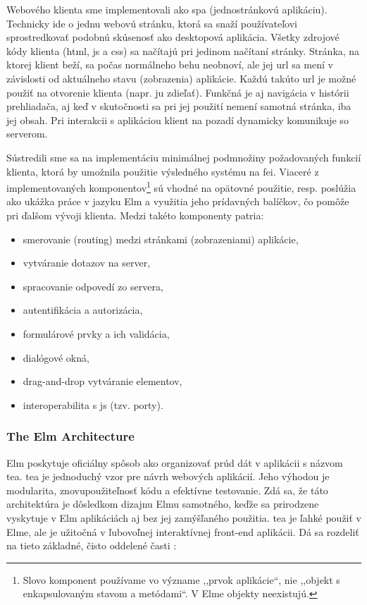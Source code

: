 Webového klienta sme implementovali ako \acrshort{spa} (jednostránkovú
aplikáciu). Technicky ide o jednu webovú stránku, ktorá sa snaží používateľovi
sprostredkovať podobnú skúsenosť ako desktopová aplikácia. Všetky zdrojové kódy
klienta (\acrshort{html}, \acrshort{js} a \acrshort{css}) sa načítajú pri
jedinom načítaní stránky. Stránka, na ktorej klient beží, sa počas normálneho
behu neobnoví, ale jej \acrshort{url} sa mení v závislosti od aktuálneho stavu
(zobrazenia) aplikácie. Každú takúto \acrshort{url} je možné použiť na otvorenie
klienta (napr. ju zdieľať). Funkčná je aj navigácia v histórii prehliadača, aj
keď v skutočnosti sa pri jej použití nemení samotná stránka, iba jej obsah. Pri
interakcii s aplikáciou klient na pozadí dynamicky komunikuje so serverom.

Sústredili sme sa na implementáciu minimálnej podmnožiny požadovaných funkcií
klienta, ktorá by umožnila použitie výsledného systému na \acrshort{fei}.
Viaceré z implementovaných komponentov\footnote{Slovo komponent používame vo
  význame ,,prvok aplikácie``, nie ,,objekt s enkapsulovaným stavom a
  metódami``. V Elme objekty neexistujú.} sú vhodné na opätovné použitie, resp.
poslúžia ako ukážka práce v jazyku Elm a využitia jeho prídavných balíčkov, čo
pomôže pri ďalšom vývoji klienta. Medzi takéto komponenty patria:

\begin{itemize}
\item smerovanie (routing) medzi stránkami (zobrazeniami) aplikácie,
\item vytváranie dotazov na server,
\item spracovanie odpovedí zo servera,
\item autentifikácia a autorizácia,
\item formulárové prvky a ich validácia,
\item dialógové okná,
\item drag-and-drop vytváranie elementov,
\item interoperabilita s \acrshort{js} (tzv. porty).
\end{itemize}

\subsubsection{The Elm Architecture}
\label{subsubsec:tea}

Elm poskytuje oficiálny spôsob ako organizovať prúd dát v aplikácii s názvom
\acrfull{tea}. \acrshort{tea} je jednoduchý vzor pre návrh webových aplikácií.
Jeho výhodou je modularita, znovupoužiteľnosť kódu a efektívne testovanie. Zdá
sa, že táto architektúra je dôsledkom dizajnu Elmu samotného, keďže sa
prirodzene vyskytuje v Elm aplikáciách aj bez jej zamýšľaného použitia.
\acrshort{tea} je ľahké použiť v Elme, ale je užitočná v ľubovoľnej
interaktívnej front-end aplikácii. Dá sa rozdeliť na tieto základné, čisto
oddelené časti \cite{elm_guide}:

